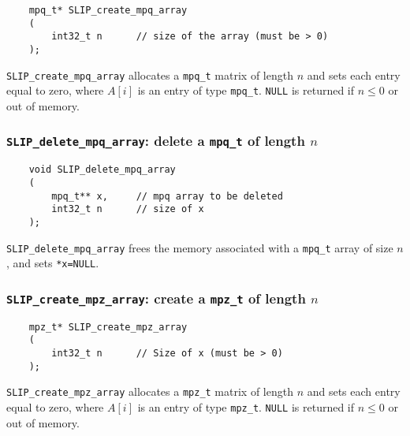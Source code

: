 \documentclass[12pt]{article}
\theoremstyle{definition}
\begin{document}
\begin{mdframed}[userdefinedwidth=6in]
{\footnotesize
\begin{verbatim}
    mpq_t* SLIP_create_mpq_array
    (
        int32_t n      // size of the array (must be > 0)
    );
\end{verbatim}
} \end{mdframed}


\verb|SLIP_create_mpq_array| allocates a \verb|mpq_t| matrix of length $n$ and
sets each entry equal to zero, where  $A[i]$ is an entry of type \verb|mpq_t|.
 \verb|NULL| is returned if
$n\le 0$ or out of memory.

\cprotect\subsubsection{\verb|SLIP_delete_mpq_array|: delete a \verb|mpq_t| of length $n$}

\begin{mdframed}[userdefinedwidth=6in]
{\footnotesize
\begin{verbatim}
    void SLIP_delete_mpq_array
    (
        mpq_t** x,     // mpq array to be deleted
        int32_t n      // size of x
    );
\end{verbatim}
} \end{mdframed}


\verb|SLIP_delete_mpq_array| frees the memory associated with a \verb|mpq_t|
array of size $n$, and sets \verb|*x=NULL|.

\cprotect\subsubsection{\verb|SLIP_create_mpz_array|: create a \verb|mpz_t| of length $n$}
\label{ss:create_mpz_array}

\begin{mdframed}[userdefinedwidth=6in]
{\footnotesize
\begin{verbatim}
    mpz_t* SLIP_create_mpz_array
    (
        int32_t n      // Size of x (must be > 0)
    );
\end{verbatim}
} \end{mdframed}

\verb|SLIP_create_mpz_array| allocates a \verb|mpz_t| matrix of length $n$ and
sets each entry equal to zero, where  $A[i]$ is an entry of type \verb|mpz_t|.
 \verb|NULL| is returned if
$n\le 0$ or out of memory.
\end{document}

